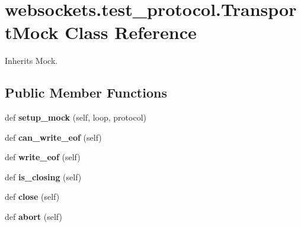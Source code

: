 \hypertarget{classwebsockets_1_1test__protocol_1_1_transport_mock}{}\section{websockets.\+test\+\_\+protocol.\+Transport\+Mock Class Reference}
\label{classwebsockets_1_1test__protocol_1_1_transport_mock}


Inherits Mock.

\subsection*{Public Member Functions}
\begin{DoxyCompactItemize}
\item 
\mbox{\label{classwebsockets_1_1test__protocol_1_1_transport_mock_a04becc41a36a5232cf1aa50835dc3043}} 
def {\bfseries setup\+\_\+mock} (self, loop, protocol)
\item 
\mbox{\label{classwebsockets_1_1test__protocol_1_1_transport_mock_a547371e8f82f4548dbfdbf52c3fe5244}} 
def {\bfseries can\+\_\+write\+\_\+eof} (self)
\item 
\mbox{\label{classwebsockets_1_1test__protocol_1_1_transport_mock_a8fc722d2c9642f5188444a7e402c94f6}} 
def {\bfseries write\+\_\+eof} (self)
\item 
\mbox{\label{classwebsockets_1_1test__protocol_1_1_transport_mock_ac742d52ad0340d913a392826fa4a3462}} 
def {\bfseries is\+\_\+closing} (self)
\item 
\mbox{\label{classwebsockets_1_1test__protocol_1_1_transport_mock_af13a6a975c8cf043d43473f3de8dcbd7}} 
def {\bfseries close} (self)
\item 
\mbox{\label{classwebsockets_1_1test__protocol_1_1_transport_mock_a8b3a8d9e3940ec4da2eb29b830839fdd}} 
def {\bfseries abort} (self)
\end{DoxyCompactItemize}
